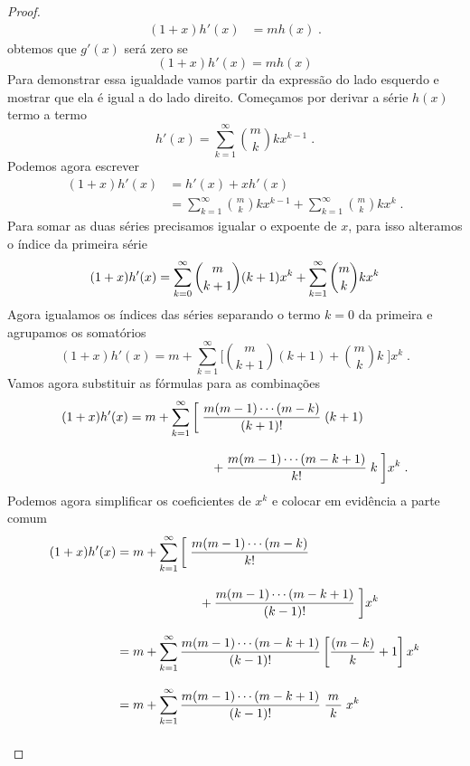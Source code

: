 \begin{proof}
\begin{align*}
    (1+x) h'(x)                            & = m h(x)   \;.
  \end{align*}
  obtemos que $g'(x)$ será zero se
  \[
    (1+x) h'(x) = m h(x)
  \]
  Para demonstrar essa igualdade vamos partir da expressão do lado esquerdo
  e mostrar que ela é igual a do lado direito.
  Começamos por derivar a série $h(x)$ termo a termo
  \[
    h'(x) = \sum_{k=1}^\infty \binom{m}{k} k x^{k-1}   \;.
  \]
  Podemos agora escrever
  \begin{align*}
    (1+x) h'(x) & = h'(x) + xh'(x) \\
                & = \sum_{k=1}^\infty \binom{m}{k} k x^{k-1}
                + \sum_{k=1}^\infty \binom{m}{k} k x^k    \;.
  \end{align*}
  Para somar as duas séries precisamos igualar o
  expoente de $x$, para isso alteramos o índice da primeira série
  \[
    (1+x) h'(x)
       = \sum_{k=0}^\infty \binom{m}{k+1} (k+1) x^k
       + \sum_{k=1}^\infty \binom{m}{k}    k    x^k \\[3mm]
  \]
  Agora igualamos os índices das séries separando o termo $k=0$ da primeira
  e agrupamos os somatórios
  \[
    (1+x) h'(x) = m + \sum_{k=1}^\infty
                      \bigg[ \binom{m}{k+1} (k+1)
                           + \binom{m}{k}    k    \;
                      \bigg] x^k     \;.
  \]
  Vamos agora substituir as fórmulas para as combinações
  \begin{align*}
    (1+x) h'(x)
    & = m + \sum_{k=1}^\infty \bigg[\; \frac{m(m-1)\cdots(m-k)  }{(k+1)!} \;(k+1)             \\[3mm]
    &       \hspace{23mm}            + \frac{m(m-1)\cdots(m-k+1)}{ k!   } \; k \;\bigg] x^{k} \;.
  \end{align*}
  Podemos agora simplificar os coeficientes de $x^k$ e colocar em evidência a parte comum
  \begin{align*}
    (1+x) h'(x)
    & = m + \sum_{k=1}^\infty \bigg[\; \frac{m(m-1)\cdots(m-k)  }{k!    }                \\[3mm]
    &       \hspace{23mm}            + \frac{m(m-1)\cdots(m-k+1)}{(k-1)!} \;\bigg] x^{k} \\[3mm]
    & = m + \sum_{k=1}^\infty \frac{m(m-1)\cdots(m-k+1)}{(k-1)!}
                              \left[ \frac{(m-k)}{k}+1 \right] x^{k}                     \\[3mm]
    & = m+\sum_{k=1}^\infty \frac{m(m-1)\cdots(m-k+1)}{(k-1)!}\;\frac{\,m\,}{k}\; x^{k}  \\[3mm]

\end{align*}
\end{proof}
